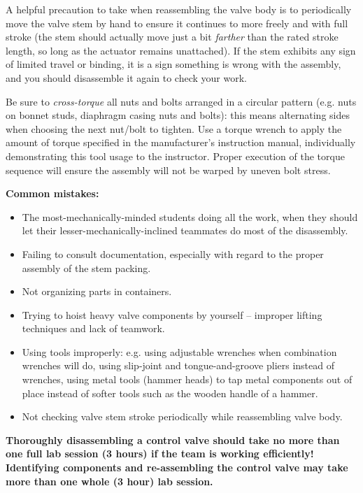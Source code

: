 \documentclass[12pt,a4paper]{article}
\begin{document}
\begin{itemize}
A helpful precaution to take when reassembling the valve body is to periodically move the valve stem by hand to ensure it continues to more freely and with full stroke (the stem should actually move just a bit {\it farther} than the rated stroke length, so long as the actuator remains unattached).  If the stem exhibits any sign of limited travel or binding, it is a sign something is wrong with the assembly, and you should disassemble it again to check your work.

Be sure to {\it cross-torque} all nuts and bolts arranged in a circular pattern (e.g. nuts on bonnet studs, diaphragm casing nuts and bolts): this means alternating sides when choosing the next nut/bolt to tighten.  Use a torque wrench to apply the amount of torque specified in the manufacturer's instruction manual, individually demonstrating this tool usage to the instructor.  Proper execution of the torque sequence will ensure the assembly will not be warped by uneven bolt stress.

\vskip 10pt

{\bf Common mistakes:}

\begin{itemize}
\item{} The most-mechanically-minded students doing all the work, when they should let their lesser-mechanically-inclined teammates do most of the disassembly.
\item{} Failing to consult documentation, especially with regard to the proper assembly of the stem packing.
\item{} Not organizing parts in containers.
\item{} Trying to hoist heavy valve components by yourself -- improper lifting techniques and lack of teamwork.
\item{} Using tools improperly: e.g. using adjustable wrenches when combination wrenches will do, using slip-joint and tongue-and-groove pliers instead of wrenches, using metal tools (hammer heads) to tap metal components out of place instead of softer tools such as the wooden handle of a hammer.
\item{} Not checking valve stem stroke periodically while reassembling valve body.
\end{itemize}

\vskip 10pt

{\bf Thoroughly disassembling a control valve should take no more than one full lab session (3 hours) if the team is working efficiently!  Identifying components and re-assembling the control valve may take more than one whole (3 hour) lab session.}



\end{itemize}
\end{document}

